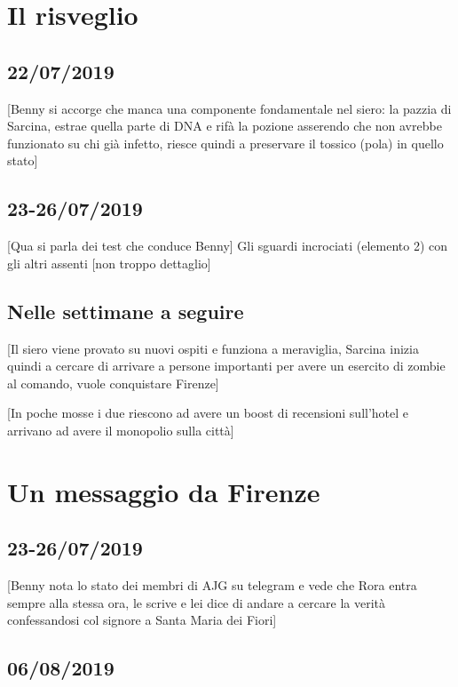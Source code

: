 \section{Il risveglio}
\subsection*{22/07/2019}
[Benny si accorge che manca una componente fondamentale nel siero: la pazzia di Sarcina, estrae quella parte di DNA e rifà la pozione asserendo che non avrebbe funzionato su chi già infetto, riesce quindi a preservare il tossico (pola) in quello stato] 


\subsection*{23-26/07/2019}
[Qua si parla dei test che conduce Benny]
Gli sguardi incrociati (elemento 2) con gli altri assenti [non troppo dettaglio]


\subsection*{Nelle settimane a seguire}
[Il siero viene provato su nuovi ospiti e funziona a meraviglia, Sarcina inizia quindi a cercare di arrivare a persone importanti per avere un esercito di zombie al comando, vuole conquistare Firenze]

[In poche mosse i due riescono ad avere un boost di recensioni sull'hotel e arrivano ad avere il monopolio sulla città]


\section{Un messaggio da Firenze}

\subsection*{23-26/07/2019}

[Benny nota lo stato dei membri di AJG su telegram e vede che Rora entra sempre alla stessa ora, le scrive e lei dice di andare a cercare la verità confessandosi col signore a Santa Maria dei Fiori]
\subsection*{06/08/2019}

